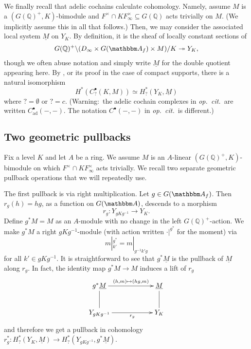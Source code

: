 \documentclass[10pt, twoside]{amsart}
\theoremstyle{plain}
\theoremstyle{definition}
\theoremstyle{remark}
\numberwithin{equation}{subsection}
\def\Q{\mathbb Q}
\def\A{\mathbbm A}
\begin{document}
We finally recall that adelic cochains calculate cohomology. Namely, assume $M$ is a $(G(\Q)^+,K)$-bimodule and $F^\times \cap KF_\infty^\times \subseteq G(\Q)$ acts trivially on $M$. (We implicitly assume this in all that follows.) Then, we may consider the associated local system $\underline M$ on $Y_K$. By definition, it is the sheaf of locally constant sections of
$$
G(\Q)^+\backslash (D_\infty \times G(\A_f) \times M) / K \twoheadrightarrow Y_K,
$$
though we often abuse notation and simply write $\underline M$ for the double quotient appearing here. By \cite[Proposition 2.1.1]{Hansen}, or its proof in the case of compact supports, there is a natural isomorphism
$$
H^{\ast}(C^{\bullet}_{?}(K,M)) \simeq H^{\ast}_{?}(Y_K,\underline M)
$$
where $? = \emptyset$ or $? = c$. (Warning:\ the adelic cochain complexes in {\em op.\ cit.}\ are written $C^{\bullet}_{\mathrm{ad}}(-,-)$. The notation $C^{\bullet}(-,-)$ in {\em op.\ cit.}\ is different.)

\subsection{Two geometric pullbacks}\label{subsec:pullbacks}
Fix a level $K$ and let $A$ be a ring. We assume $M$ is an $A$-linear $(G(\Q)^+,K)$-bimodule on which $F^\times \cap K F_\infty^\times$ acts trivially. We recall two separate geometric pullback operations that we will repeatedly use.

The first pullback is via right multiplication. Let ${ g} \in G(\A_f)$. Then $r_{ g}(h) = h{ g}$, as a function on $G(\A)$, descends to a morphism
\begin{equation*}
r_{ g} : Y_{{ g} K { g}^{-1}} \longrightarrow Y_K.
\end{equation*}
Define ${ g}^{\ast}M=M$ as an $A$-module with no change in the left $G(\Q)^+$-action. We make ${ g}^{\ast}M$ a right ${ g} K { g}^{-1}$-module (with action written $\cdot |^{{ g}^{\ast}}$ for the moment) via
$$
m|^{{ g}^{\ast}}_{k'} = m|_{{ g}^{-1}k'{ g}}
$$
for all $k' \in { g} K { g}^{-1}$. It is straightforward to see that ${ g}^{\ast}\underline M$ is the pullback of $\underline M$ along $r_{ g}$. In fact, the identity map ${ g}^{\ast}M \rightarrow M$ induces a lift of $r_{ g}$
\begin{equation*}
\xymatrixcolsep{5pc}
\xymatrix{
{ g}^{\ast}\underline M \ar@{-}[d] \ar[r]^-{(h,m) \mapsto (h{ g}, m)} & \underline M \ar@{-}[d]\\
Y_{{ g} K { g}^{-1}} \ar[r]_-{r_{ g}} & Y_{K}
}
\end{equation*}
and therefore we get a pullback in cohomology $r_{{ g}}^{\ast}: H^{\ast}_{?}(Y_K,\underline M) \rightarrow H^{\ast}_{?}(Y_{{ g} K { g}^{-1}}, { g}^{\ast}\underline M)$.
\end{document}
